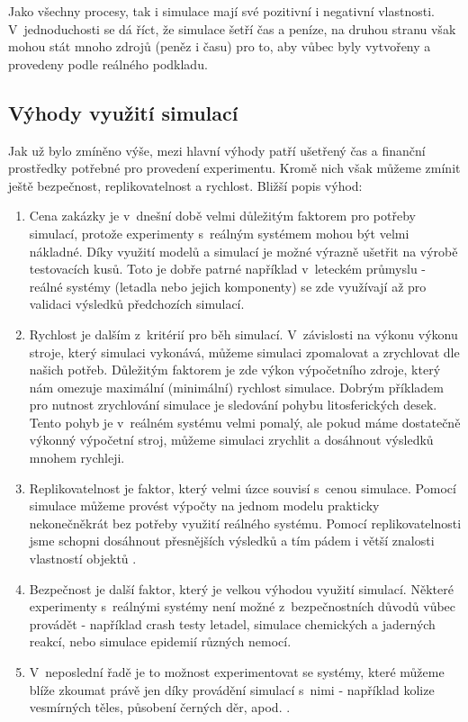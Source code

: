 Jako všechny procesy, tak i simulace mají své pozitivní i negativní vlastnosti. V~jednoduchosti se dá říct, že simulace šetří čas a peníze, na druhou stranu však mohou stát mnoho zdrojů (peněz i času) pro to, aby vůbec byly vytvořeny a provedeny podle reálného podkladu.

\subsection{Výhody využití simulací}
\label{vyhody}
Jak už bylo zmíněno výše, mezi hlavní výhody patří  ušetřený čas a finanční prostředky potřebné pro provedení experimentu. Kromě nich však můžeme zmínit ještě bezpečnost, replikovatelnost a rychlost. Bližší popis výhod:

\begin{enumerate}
    \item Cena zakázky je v~dnešní době velmi důležitým faktorem pro potřeby simulací, protože experimenty s~reálným systémem mohou být velmi nákladné. Díky využití modelů a simulací je možné výrazně ušetřit na výrobě testovacích kusů. Toto je dobře patrné například v~leteckém průmyslu - reálné systémy (letadla nebo jejich komponenty) se zde využívají až pro validaci výsledků předchozích simulací.
    \item Rychlost je dalším z~kritérií pro běh simulací. V~závislosti na výkonu výkonu stroje, který simulaci vykonává, můžeme simulaci zpomalovat a zrychlovat dle našich potřeb. Důležitým faktorem je zde výkon výpočetního zdroje, který nám omezuje maximální (minimální) rychlost simulace. Dobrým příkladem pro nutnost zrychlování simulace je sledování pohybu litosferických desek. Tento pohyb je v~reálném systému velmi pomalý, ale pokud máme dostatečně výkonný výpočetní stroj, můžeme simulaci zrychlit a dosáhnout výsledků mnohem rychleji.
    \item Replikovatelnost je faktor, který velmi úzce souvisí s~cenou simulace. Pomocí simulace můžeme provést výpočty na jednom modelu prakticky nekonečněkrát bez potřeby využití reálného systému. Pomocí replikovatelnosti jsme schopni dosáhnout přesnějších výsledků a tím pádem i větší znalosti vlastností objektů \cite{belanger2010and}.
    \item Bezpečnost je další faktor, který je velkou výhodou využití simulací. Některé experimenty s~reálnými systémy není možné z~bezpečnostních důvodů vůbec provádět - například crash testy letadel, simulace chemických a jaderných reakcí, nebo simulace epidemií různých nemocí.
    \item V~neposlední řadě je to možnost experimentovat se systémy, které můžeme blíže zkoumat právě jen díky provádění simulací s~nimi - například kolize vesmírných těles, působení černých děr, apod. \cite{Fragile_2007}.
\end{enumerate}

